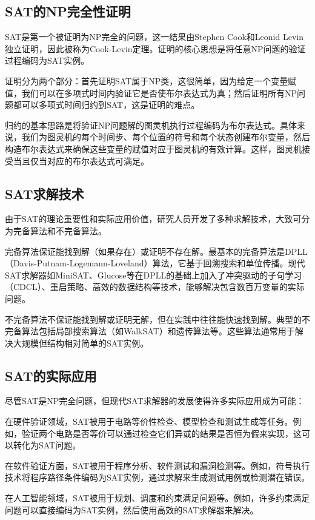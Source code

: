 \documentclass[a4paper,12pt]{ctexart}
\begin{document}
\subsection{SAT的NP完全性证明}
SAT是第一个被证明为NP完全的问题，这一结果由Stephen Cook和Leonid Levin独立证明，因此被称为Cook-Levin定理。证明的核心思想是将任意NP问题的验证过程编码为SAT实例。

证明分为两个部分：首先证明SAT属于NP类，这很简单，因为给定一个变量赋值，我们可以在多项式时间内验证它是否使布尔表达式为真；然后证明所有NP问题都可以多项式时间归约到SAT，这是证明的难点。

归约的基本思路是将验证NP问题解的图灵机执行过程编码为布尔表达式。具体来说，我们为图灵机的每个时间步、每个位置的符号和每个状态创建布尔变量，然后构造布尔表达式来确保这些变量的赋值对应于图灵机的有效计算。这样，图灵机接受当且仅当对应的布尔表达式可满足。

\subsection{SAT求解技术}
由于SAT的理论重要性和实际应用价值，研究人员开发了多种求解技术，大致可分为完备算法和不完备算法。

完备算法保证能找到解（如果存在）或证明不存在解。最基本的完备算法是DPLL（Davis-Putnam-Logemann-Loveland）算法，它基于回溯搜索和单位传播。现代SAT求解器如MiniSAT、Glucose等在DPLL的基础上加入了冲突驱动的子句学习（CDCL）、重启策略、高效的数据结构等技术，能够解决包含数百万变量的实际问题。

不完备算法不保证能找到解或证明无解，但在实践中往往能快速找到解。典型的不完备算法包括局部搜索算法（如WalkSAT）和遗传算法等。这些算法通常用于解决大规模但结构相对简单的SAT实例。

\subsection{SAT的实际应用}
尽管SAT是NP完全问题，但现代SAT求解器的发展使得许多实际应用成为可能：

在硬件验证领域，SAT被用于电路等价性检查、模型检查和测试生成等任务。例如，验证两个电路是否等价可以通过检查它们异或的结果是否恒为假来实现，这可以转化为SAT问题。

在软件验证方面，SAT被用于程序分析、软件测试和漏洞检测等。例如，符号执行技术将程序路径条件编码为SAT实例，通过求解来生成测试用例或检测潜在错误。

在人工智能领域，SAT被用于规划、调度和约束满足问题等。例如，许多约束满足问题可以直接编码为SAT实例，然后使用高效的SAT求解器来解决。
\end{document}
